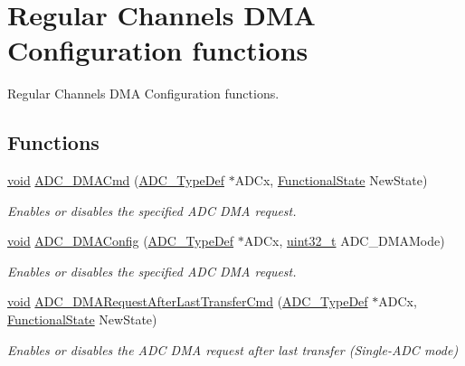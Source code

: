 \hypertarget{group___a_d_c___group5}{\section{Regular Channels D\-M\-A Configuration functions}
\label{group___a_d_c___group5}
}


Regular Channels D\-M\-A Configuration functions.  


\subsection*{Functions}
\begin{DoxyCompactItemize}
\item 
\hyperlink{group___n_a_m_e_ga18028b8badbf1ea7e704ccac3c488e82}{void} \hyperlink{group___a_d_c___group5_gac5881d5995818001584b27b137a8dbcb}{A\-D\-C\-\_\-\-D\-M\-A\-Cmd} (\hyperlink{struct_a_d_c___type_def}{A\-D\-C\-\_\-\-Type\-Def} $\ast$A\-D\-Cx, \hyperlink{group___exported__types_gac9a7e9a35d2513ec15c3b537aaa4fba1}{Functional\-State} New\-State)
\begin{DoxyCompactList}\small\item\em Enables or disables the specified A\-D\-C D\-M\-A request. \end{DoxyCompactList}\item 
\hyperlink{group___n_a_m_e_ga18028b8badbf1ea7e704ccac3c488e82}{void} \hyperlink{group___a_d_c___group5_ga450be24f95d7b324a38f03b3484ab57f}{A\-D\-C\-\_\-\-D\-M\-A\-Config} (\hyperlink{struct_a_d_c___type_def}{A\-D\-C\-\_\-\-Type\-Def} $\ast$A\-D\-Cx, \hyperlink{stdint_8h_a435d1572bf3f880d55459d9805097f62}{uint32\-\_\-t} A\-D\-C\-\_\-\-D\-M\-A\-Mode)
\begin{DoxyCompactList}\small\item\em Enables or disables the specified A\-D\-C D\-M\-A request. \end{DoxyCompactList}\item 
\hyperlink{group___n_a_m_e_ga18028b8badbf1ea7e704ccac3c488e82}{void} \hyperlink{group___a_d_c___group5_ga912fd3e923ae4435621724e1bbc52729}{A\-D\-C\-\_\-\-D\-M\-A\-Request\-After\-Last\-Transfer\-Cmd} (\hyperlink{struct_a_d_c___type_def}{A\-D\-C\-\_\-\-Type\-Def} $\ast$A\-D\-Cx, \hyperlink{group___exported__types_gac9a7e9a35d2513ec15c3b537aaa4fba1}{Functional\-State} New\-State)
\begin{DoxyCompactList}\small\item\em Enables or disables the A\-D\-C D\-M\-A request after last transfer (Single-\/\-A\-D\-C mode) \end{DoxyCompactList}\item 

\end{DoxyCompactItemize}
